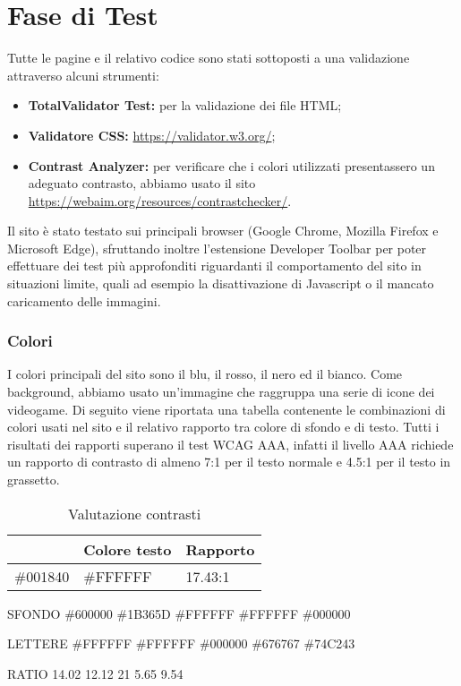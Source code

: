 \section{Fase di Test}
Tutte le pagine e il relativo codice sono stati sottoposti a una validazione attraverso alcuni strumenti:
\begin{itemize}
	\item \textbf{TotalValidator Test:} per la validazione dei file HTML;
	\item \textbf{Validatore CSS:} \url{https://validator.w3.org/};
	\item \textbf{Contrast Analyzer:} per verificare che i colori utilizzati presentassero un adeguato contrasto, abbiamo usato il sito \url{https://webaim.org/resources/contrastchecker/}.
\end{itemize}
Il sito è stato testato sui principali browser (Google Chrome, Mozilla Firefox e Microsoft Edge), sfruttando inoltre l'estensione Developer Toolbar per poter effettuare 
dei test più approfonditi riguardanti il comportamento del sito in situazioni limite, quali ad esempio la disattivazione di Javascript o il mancato caricamento delle immagini.

\subsubsection{Colori}
I colori principali del sito sono il blu, il rosso, il nero ed il bianco. Come background, abbiamo usato un’immagine che raggruppa una serie di icone dei videogame. Di seguito viene riportata una tabella contenente le combinazioni di colori usati nel sito e il relativo rapporto tra colore di sfondo e di testo. Tutti i risultati dei rapporti superano il test WCAG AAA, infatti il livello AAA richiede un rapporto di contrasto di almeno 7:1 per il testo normale e 4.5:1 per il testo in grassetto.

\begin{center}
	\renewcommand{\arraystretch}{1.8}
	\begin{longtable}[H]{l l l}
		\caption{Valutazione contrasti}\\
		\rowcolor[HTML]{FF9933}
		\multicolumn{1}{c}{\color[HTML]{FFFFFF} \textbf{Colore sfondo}} &
		\multicolumn{1}{c}{\color[HTML]{FFFFFF} \textbf{Colore testo}} &
		\multicolumn{1}{c}{\color[HTML]{FFFFFF} \textbf{Rapporto}} \\
		\endhead
		\#001840 & \#FFFFFF & 17.43:1\\
	\end{longtable}
\end{center}



SFONDO  \#600000    \#1B365D   \#FFFFFF    \#FFFFFF   \#000000

LETTERE \#FFFFFF     \#FFFFFF   \#000000    \#676767   \#74C243

RATIO   14.02       12.12     21         5.65       9.54